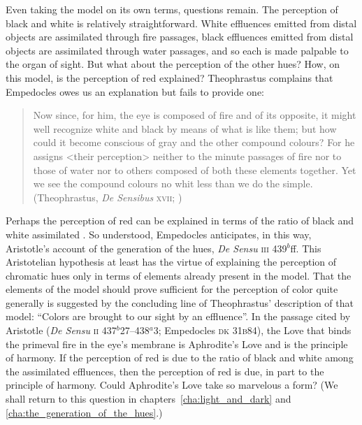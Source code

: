 Even taking the model on its own terms, questions remain. The perception of black and white is relatively straightforward. White effluences emitted from distal objects are assimilated through fire passages, black effluences emitted from distal objects are assimilated through water passages, and so each is made palpable to the organ of sight. But what about the perception of the other hues? How, on this model, is the perception of red explained? Theophrastus complains that Empedocles owes us an explanation but fails to provide one:
\begin{quote}
	Now since, for him, the eye is composed of fire and of its opposite, it might well recognize white and black by means of what is like them; but how could it become conscious of gray and the other compound colours? For he assigns <their perception> neither to the minute passages of fire nor to those of water nor to others composed of both these elements together. Yet we see the compound colours no whit less than we do the simple. (Theophrastus, \emph{De Sensibus} \textsc{xvii}; \citealt[81]{Stratton:1917vn})
\end{quote}
Perhaps the perception of red can be explained in terms of the ratio of black and white assimilated \citep{Ierodiakonou:2005fk}. So understood, Empedocles anticipates, in this way, Aristotle's account of the generation of the hues, \emph{De Sensu} \textsc{iii} 439\( ^{b} \)ff. This Aristotelian hypothesis at least has the virtue of explaining the perception of chromatic hues only in terms of elements already present in the model. That the elements of the model should prove sufficient for the perception of color quite generally is suggested by the concluding line of Theophrastus' description of that model: ``Colors are brought to our sight by an effluence''. In the passage cited by Aristotle (\emph{De Sensu} \textsc{ii} 437\( ^{b} \)27--438\( ^{a} \)3; Empedocles \textsc{dk} 31\textsc{b}84), the Love that binds the primeval fire in the eye's membrane is Aphrodite's Love and is the principle of harmony. If the perception of red is due to the ratio of black and white among the assimilated effluences, then the perception of red is due, in part to the principle of harmony. Could Aphrodite's Love take so marvelous a form? (We shall return to this question in chapters~\ref{cha:light_and_dark} and \ref{cha:the_generation_of_the_hues}.)

